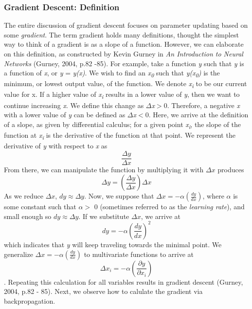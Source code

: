 \documentclass[11pt]{article}
\begin{document}
\subsubsection{Gradient Descent: Definition}
The entire discussion of gradient descent focuses on parameter updating based on some \textit{gradient}. The term gradient holds many definitions, thought the simplest way to think of a gradient is as a slope of a function. However, we can elaborate on this definition, as constructed by Kevin Gurney in \textit{An Introduction to Neural Networks} (Gurney, 2004, p.82 -85). For example, take a function \textit{y} such that \textit{y} is a function of \textit{x}, or \textit{y} = \textit{y(x)}. We wish to find an \textit{x\textsubscript{0}} such that \textit{y(x\textsubscript{0})} is the minimum, or lowest output value, of the function. We denote \textit{x\textsubscript{i}} to be our current value for x. If a higher value of \textit{x\textsubscript{i}} results in a lower value of \textit{y}, then we want to continue increasing \textit{x}. We define this change as $\Delta$\textit{x}$>$0. Therefore, a negative \textit{x} with a lower value of \textit{y} can be defined as $\Delta$\textit{x}$<$0. Here, we arrive at the definition of a slope, as given by differential calculus; for a given point \textit{x\textsubscript{i}}, the slope of the function at \textit{x\textsubscript{i}} is the derivative of the function at that point. We represent the derivative of \textit{y} with respect to \textit{x} as $$\frac{\Delta y}{\Delta x}$$ From there, we can manipulate the function by multiplying it with $\Delta x$ produces $$\Delta y = (\frac{\Delta y}{\Delta x})\Delta x$$ As we reduce $\Delta x$, $dy \approx \Delta y$. Now, we suppose that $\Delta x = -\alpha(\frac{dy}{dx}) $, where $\alpha$ is some constant such that $\alpha > $ 0 (sometimes referred to as the \textit{learning rate}), and small enough so $dy \approx \Delta y$. If we substitute $\Delta x$, we arrive at $$ dy = -\alpha(\frac{dy}{dx})^{2}$$ which indicates that \textit{y} will keep traveling towards the minimal point. We generalize $\Delta x = -\alpha(\frac{dy}{dx}) $ to multivariate functions to arrive at $$\Delta x_i = -\alpha(\frac{\partial y}{\partial x_i})$$. Repeating this calculation for all variables results in gradient descent (Gurney, 2004, p.82 - 85). Next, we observe how to calulate the gradient via backpropagation.
\end{document}
